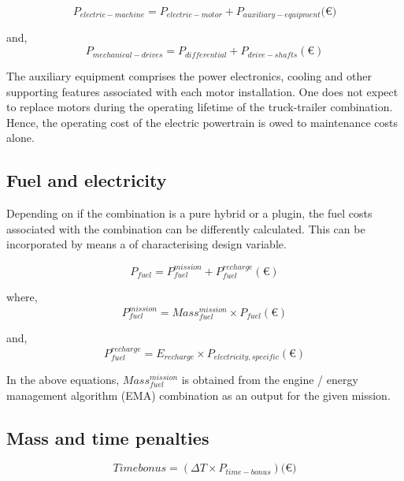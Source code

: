\documentclass[ExampleMasters.tex]{subfiles}
\begin{document}
			\begin{equation}
				P_{electric-machine} = P_{electric-motor}+P_{auxiliary-equipment} (\euro{)}
			\end{equation}

			and,
			\begin{equation}
				P_{mechanical-drives} = P_{differential}+P_{drive-shafts} (\euro{})
			\end{equation}

			The auxiliary equipment comprises the power electronics, cooling and other supporting features associated with each motor installation. One does not expect to replace motors during the operating lifetime of the truck-trailer combination. Hence, the operating cost of the electric powertrain is owed to maintenance costs alone.

		\subsection{Fuel and electricity}
			Depending on if the combination is a pure hybrid or a plugin, the fuel costs associated with the combination can be differently calculated. This can be incorporated by means a of characterising design variable.

			\begin{equation}
				P_{fuel} = P_{fuel}^{mission}+P_{fuel}^{recharge} (\euro{})
			\end{equation}

			where,
			\begin{equation}
				P_{fuel}^{mission} = Mass_{fuel}^{mission} \times P_{fuel} (\euro{})
			\end{equation}

			and,
			\begin{equation}
				P_{fuel}^{recharge} = E_{recharge} \times P_{electricity, specific} (\euro{})
			\end{equation}

			In the above equations, $Mass_{fuel}^{mission}$ is obtained from the engine / energy management algorithm (EMA) combination as an output for the given mission.

		\subsection{Mass and time penalties}

			\begin{equation} \label{eq:time}
				Time bonus = (\Delta T \times P_{time-bonus}) (\euro{)}
			\end{equation}
\end{document}
